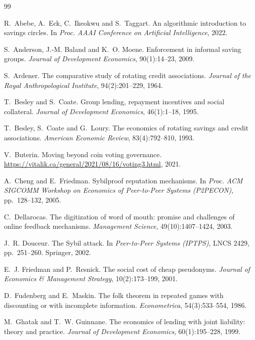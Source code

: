 \documentclass[11pt,a4paper]{article}
\theoremstyle{plain}
\theoremstyle{definition}
\theoremstyle{remark}
\newcommand{\1}{\mathbf{1}}
\begin{document}
\begin{thebibliography}{99}
\small

R.~Abebe, A.~Eck, C.~Ikeokwu and S.~Taggart.
An algorithmic introduction to savings circles.
In \emph{Proc. AAAI Conference on Artificial Intelligence}, 2022.

S.~Anderson, J.-M. Baland and K.~O. Moene.
Enforcement in informal saving groups.
\emph{Journal of Development Economics}, 90(1):14--23, 2009.

S.~Ardener.
The comparative study of rotating credit associations.
\emph{Journal of the Royal Anthropological Institute}, 94(2):201--229, 1964.

T.~Besley and S.~Coate.
Group lending, repayment incentives and social collateral.
\emph{Journal of Development Economics}, 46(1):1--18, 1995.

T.~Besley, S.~Coate and G.~Loury.
The economics of rotating savings and credit associations.
\emph{American Economic Review}, 83(4):792--810, 1993.

V.~Buterin.
Moving beyond coin voting governance.
\url{https://vitalik.ca/general/2021/08/16/voting3.html}, 2021.

A.~Cheng and E.~Friedman.
Sybilproof reputation mechanisms.
In \emph{Proc. ACM SIGCOMM Workshop on Economics of Peer-to-Peer Systems
(P2PECON)}, pp.~128--132, 2005.

C.~Dellarocas.
The digitization of word of mouth: promise and challenges of online feedback
mechanisms.
\emph{Management Science}, 49(10):1407--1424, 2003.

J.~R. Douceur.
The Sybil attack.
In \emph{Peer-to-Peer Systems (IPTPS)}, LNCS 2429, pp.~251--260. Springer, 2002.

E.~J. Friedman and P.~Resnick.
The social cost of cheap pseudonyms.
\emph{Journal of Economics \& Management Strategy}, 10(2):173--199, 2001.

D.~Fudenberg and E.~Maskin.
The folk theorem in repeated games with discounting or with incomplete
information.
\emph{Econometrica}, 54(3):533--554, 1986.

M.~Ghatak and T.~W. Guinnane.
The economics of lending with joint liability: theory and practice.
\emph{Journal of Development Economics}, 60(1):195--228, 1999.


\end{thebibliography}
\end{document}
